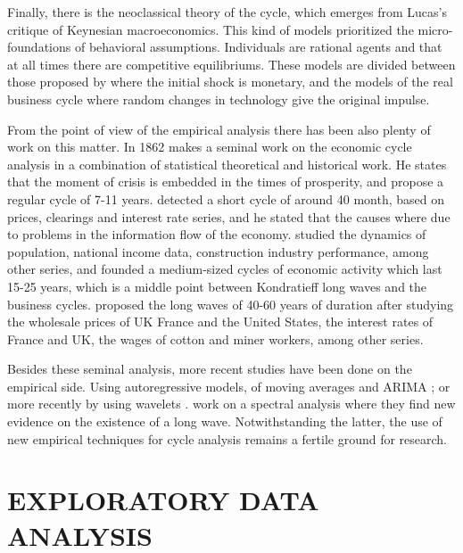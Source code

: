 \documentclass[a4paper,10cpi]{article}
\begin{document}
	Finally, there is the neoclassical theory of the cycle, which emerges from Lucas's critique of Keynesian macroeconomics. This kind of models prioritized the micro-foundations of behavioral assumptions. Individuals are rational agents and that at all times there are competitive equilibriums. These models are divided between those proposed by \cite{lucas1975equilibrium} where the initial shock is monetary, and the models of the real business cycle \citep{plosser1989understanding} where random changes in technology give the original impulse.
	
	From the point of view of the empirical analysis there has been also plenty of work on this matter. 
	In 1862 \cite{juglar2014crises} makes a seminal work on the economic cycle analysis in a combination of statistical theoretical and historical work. He states that the moment of crisis is embedded in the times of prosperity, and propose a regular cycle of 7-11 years. 
	\cite{kitchin1923cycles} detected a short cycle of around 40 month, based on prices, clearings and interest rate series, and he stated that the causes where due to problems in the information flow of the economy.
	\cite{kuznets1930secular} studied the dynamics of population, national income data, construction industry performance, among other series, and founded a medium-sized cycles of economic activity which last 15-25 years, which is a middle point between Kondratieff long waves and the business cycles. 
	 \cite{kondratieff1979long} proposed the long waves of 40-60 years of duration after studying the wholesale prices of UK France and the United States, the interest rates of France and UK, the wages of cotton and miner workers, among other series. 

	
	Besides these seminal analysis, more recent studies have been done on the empirical side. Using autoregressive models, of moving averages and ARIMA \citep {hamilton1989new, kaiser2012measuring}; or more recently by using wavelets \citep {yogo2008measuring, soares2011business}. \cite{korotayev2010spectral} work on a spectral analysis where they find new evidence on the existence of a long wave. Notwithstanding the latter, the use of new empirical techniques for cycle analysis remains a fertile ground for research.
	
	
	\section{\uppercase{\textbf{\normalsize{Exploratory Data Analysis}}}}\label{EDA}
	
\end{document}
